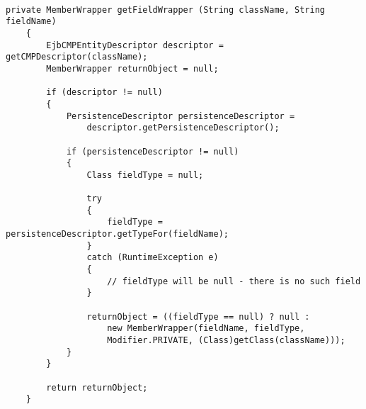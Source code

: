 \begin{lstlisting}

private MemberWrapper getFieldWrapper (String className, String fieldName)
	{
		EjbCMPEntityDescriptor descriptor = getCMPDescriptor(className);
		MemberWrapper returnObject = null;

		if (descriptor != null)
		{
			PersistenceDescriptor persistenceDescriptor =
				descriptor.getPersistenceDescriptor();

			if (persistenceDescriptor != null)
			{
				Class fieldType = null;

				try
				{
					fieldType = persistenceDescriptor.getTypeFor(fieldName);
				}
				catch (RuntimeException e)
				{
					// fieldType will be null - there is no such field
				}

				returnObject = ((fieldType == null) ? null :
					new MemberWrapper(fieldName, fieldType, 
					Modifier.PRIVATE, (Class)getClass(className)));
			}
		}

		return returnObject;
	}

\end{lstlisting}


